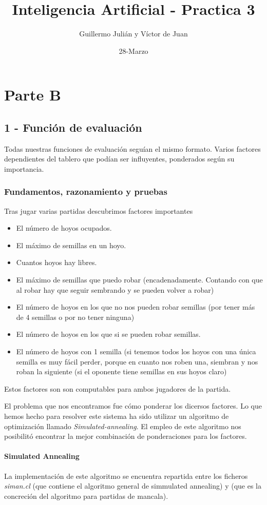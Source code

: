 \documentclass[nochap]{apuntes}
\author{Guillermo Julián y Víctor de Juan}
\date{28-Marzo}
\title{Inteligencia Artificial - Practica 3}
\begin{document}
\section*{Parte B}

\subsection*{1 - Función de evaluación}
Todas nuestras funciones de evaluación seguían el mismo formato. Varios factores dependientes del tablero que podían ser influyentes, ponderados según su importancia.

\subsubsection*{Fundamentos, razonamiento y pruebas}
Tras jugar varias partidas descubrimos factores importantes

\begin{itemize}
\item El número de hoyos ocupados.
\item El máximo de semillas en un hoyo.
\item Cuantos hoyos hay libres.
\item El máximo de semillas que puedo robar (encadenadamente. Contando con que al robar hay que seguir sembrando y se pueden volver a robar)
\item El número de hoyos en los que no nos pueden robar semillas (por tener más de 4 semillas o por no tener ninguna)
\item El número de hoyos en los que si se pueden robar semillas.
\item El número de hoyos con 1 semilla (si tenemos todos los hoyos con una única semilla es muy fácil perder, porque en cuanto nos roben una, siembran y nos roban la siguiente (si el oponente tiene semillas en sus hoyos claro)
\end{itemize}

Estos factores son son computables para ambos jugadores de la partida.

El problema que nos encontramos fue cómo ponderar los dicersos factores. Lo que hemos hecho para resolver este sistema ha sido utilizar un algoritmo de optimización llamado \textit{Simulated-annealing}. El empleo de este algoritmo nos posibilitó encontrar la mejor combinación de ponderaciones para los factores.

\paragraph{Simulated Annealing}
La implementación de este algoritmo se encuentra repartida entre los ficheros \textit{siman.cl} (que contiene el algoritmo general de simmulated annealing) y  (que es la concreción del algoritmo para partidas de mancala).
\end{document}
